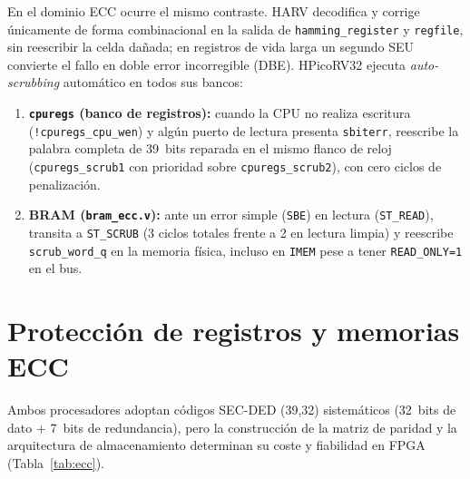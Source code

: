 \documentclass[a4paper,10pt]{article}
\begin{document}
En el dominio ECC ocurre el mismo contraste. HARV decodifica y corrige únicamente de forma combinacional en la salida de \texttt{hamming\_register} y \texttt{regfile}, sin reescribir la celda dañada; en registros de vida larga un segundo SEU convierte el fallo en doble error incorregible (DBE). HPicoRV32 ejecuta \textit{auto-scrubbing} automático en todos sus bancos:
\begin{enumerate}
  \item \textbf{\texttt{cpuregs} (banco de registros):} cuando la CPU no realiza escritura (\texttt{!cpuregs\_cpu\_wen}) y algún puerto de lectura presenta \texttt{sbiterr}, reescribe la palabra completa de 39~bits reparada en el mismo flanco de reloj (\texttt{cpuregs\_scrub1} con prioridad sobre \texttt{cpuregs\_scrub2}), con cero ciclos de penalización.
  \item \textbf{BRAM (\texttt{bram\_ecc.v}):} ante un error simple (\texttt{SBE}) en lectura (\texttt{ST\_READ}), transita a \texttt{ST\_SCRUB} (3 ciclos totales frente a 2 en lectura limpia) y reescribe \texttt{scrub\_word\_q} en la memoria física, incluso en \texttt{IMEM} pese a tener \texttt{READ\_ONLY=1} en el bus.
\end{enumerate}

\section{Protección de registros y memorias ECC}

Ambos procesadores adoptan códigos SEC-DED (39,32) sistemáticos (32~bits de dato + 7~bits de redundancia), pero la construcción de la matriz de paridad y la arquitectura de almacenamiento determinan su coste y fiabilidad en FPGA (Tabla~\ref{tab:ecc}).
\end{document}
